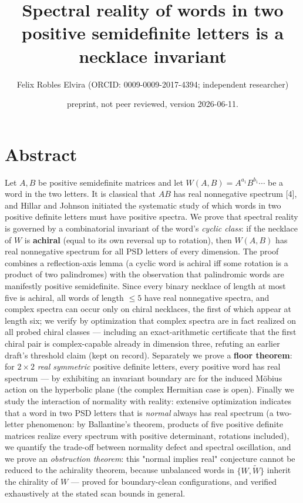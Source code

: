 \documentclass[11pt]{article}
\title{Spectral reality of words in two positive semidefinite letters is a necklace invariant}
\author{Felix Robles Elvira (ORCID: 0009-0009-2017-4394; independent researcher)}
\date{\small preprint, not peer reviewed, version 2026-06-11.}
\begin{document}
\maketitle

\section*{Abstract}
Let $A, B$ be positive semidefinite matrices and let $W(A,B) = A^{a_1}B^{b_1}\cdots$ be a word in the two letters.  It is classical that $AB$ has real nonnegative spectrum [4], and Hillar and Johnson initiated the systematic study of which words in two positive definite letters must have positive spectra.  We prove that spectral reality is governed by a combinatorial invariant of the word's \emph{cyclic class}: if the necklace of $W$ is \textbf{achiral} (equal to its own reversal up to rotation), then $W(A,B)$ has real nonnegative spectrum for all PSD letters of every dimension.  The proof combines a reflection-axis lemma (a cyclic word is achiral iff some rotation is a product of two palindromes) with the observation that palindromic words are manifestly positive semidefinite.  Since every binary necklace of length at most five is achiral, all words of length $\le 5$ have real nonnegative spectra, and complex spectra can occur only on chiral necklaces, the first of which appear at length six; we verify by optimization that complex spectra are in fact realized on all probed chiral classes — including an exact-arithmetic certificate that the first chiral pair is complex-capable already in dimension three, refuting an earlier draft's threshold claim (kept on record).  Separately we prove a \textbf{floor theorem}: for $2\times 2$ \emph{real symmetric} positive definite letters, every positive word has real spectrum — by exhibiting an invariant boundary arc for the induced Möbius action on the hyperbolic plane (the complex Hermitian case is open). Finally we study the interaction of normality with reality: extensive optimization indicates that a word in two PSD letters that is \emph{normal} always has real spectrum (a two-letter phenomenon: by Ballantine's theorem, products of five positive definite matrices realize every spectrum with positive determinant, rotations included), we quantify the trade-off between normality defect and spectral oscillation, and we prove an \emph{obstruction theorem}: this "normal implies real" conjecture cannot be reduced to the achirality theorem, because unbalanced words in $\{W, \widetilde W\}$ inherit the chirality of $W$ — proved for boundary-clean configurations, and verified exhaustively at the stated scan bounds in general.
\end{document}
